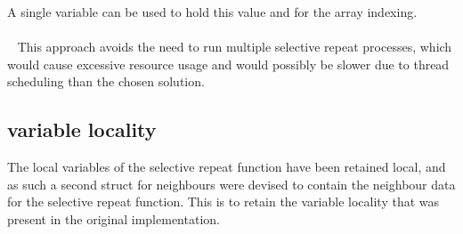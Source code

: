 A single variable can be used to hold this value and for the array indexing.\\
\\~
This approach avoids the need to run multiple selective repeat processes, which would cause excessive resource usage and would possibly be slower due to thread scheduling than the chosen solution.

\subsection{variable locality}
The local variables of the selective repeat function have been retained local, and as such a second struct for neighbours were devised to contain the neighbour data for the selective repeat function. This is to retain the variable locality that was present in the original implementation.

